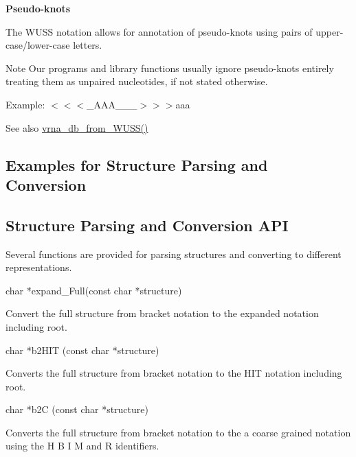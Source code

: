 \begin{DoxyItemize}
\item {\bfseries Pseudo-\/knots}

The W\+U\+SS notation allows for annotation of pseudo-\/knots using pairs of upper-\/case/lower-\/case letters. \begin{DoxyNote}{Note}
Our programs and library functions usually ignore pseudo-\/knots entirely treating them as unpaired nucleotides, if not stated otherwise.
\end{DoxyNote}
Example\+: {\ttfamily $<$$<$$<$\+\_\+\+A\+A\+A\+\_\+\+\_\+\+\_\+$>$$>$$>$aaa} 
\end{DoxyItemize}

\begin{DoxySeeAlso}{See also}
\hyperlink{group__struct__utils_ga02ca70cffb2d864f7b2d95d92218bae0}{vrna\+\_\+db\+\_\+from\+\_\+\+W\+U\+S\+S()}
\end{DoxySeeAlso}
\hypertarget{rna_structure_notations_structure_notations_examples}{}\subsection{Examples for Structure Parsing and Conversion}\label{rna_structure_notations_structure_notations_examples}
\hypertarget{rna_structure_notations_structure_notations_api}{}\subsection{Structure Parsing and Conversion A\+PI}\label{rna_structure_notations_structure_notations_api}
Several functions are provided for parsing structures and converting to different representations.

\begin{DoxyVerb}char  *expand_Full(const char *structure)
\end{DoxyVerb}
 Convert the full structure from bracket notation to the expanded notation including root.

\begin{DoxyVerb}char *b2HIT (const char *structure)
\end{DoxyVerb}
 Converts the full structure from bracket notation to the H\+IT notation including root.

\begin{DoxyVerb}char *b2C (const char *structure)
\end{DoxyVerb}
 Converts the full structure from bracket notation to the a coarse grained notation using the \textquotesingle{}H\textquotesingle{} \textquotesingle{}B\textquotesingle{} \textquotesingle{}I\textquotesingle{} \textquotesingle{}M\textquotesingle{} and \textquotesingle{}R\textquotesingle{} identifiers.

